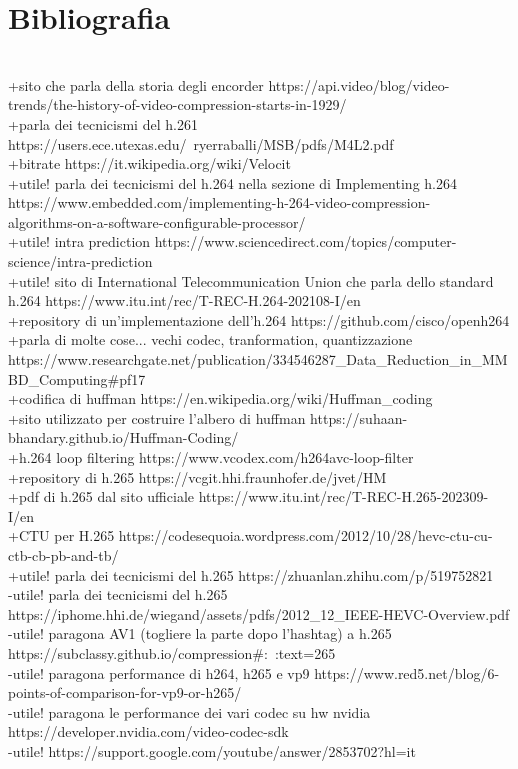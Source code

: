\documentclass[a4paper,12pt, oneside]{article}
\begin{document}
\section{Bibliografia}
\\+sito che parla della storia degli encorder https://api.video/blog/video-trends/the-history-of-video-compression-starts-in-1929/
\\+parla dei tecnicismi del h.261 https://users.ece.utexas.edu/~ryerraballi/MSB/pdfs/M4L2.pdf
\\+bitrate https://it.wikipedia.org/wiki/Velocit%
\\+utile! parla dei tecnicismi del h.264 nella sezione di Implementing h.264 https://www.embedded.com/implementing-h-264-video-compression-\\algorithms-on-a-software-configurable-processor/
\\+utile! intra prediction https://www.sciencedirect.com/topics/computer-science/intra-prediction
\\+utile! sito di International Telecommunication Union che parla dello standard h.264 https://www.itu.int/rec/T-REC-H.264-202108-I/en
\\+repository di un'implementazione dell'h.264 https://github.com/cisco/openh264
\\+parla di molte cose... vechi codec, tranformation, quantizzazione https://www.researchgate.net/publication/334546287_Data_Reduction_in_MMBD_Computing#pf17
\\+codifica di huffman https://en.wikipedia.org/wiki/Huffman_coding
\\+sito utilizzato per costruire l'albero di huffman https://suhaan-bhandary.github.io/Huffman-Coding/
\\+h.264 loop filtering https://www.vcodex.com/h264avc-loop-filter
\\+repository di h.265 https://vcgit.hhi.fraunhofer.de/jvet/HM
\\+pdf di h.265 dal sito ufficiale https://www.itu.int/rec/T-REC-H.265-202309-I/en
\\+CTU per H.265 https://codesequoia.wordpress.com/2012/10/28/hevc-ctu-cu-ctb-cb-pb-and-tb/
\\+utile! parla dei tecnicismi del h.265 https://zhuanlan.zhihu.com/p/519752821
\\-utile! parla dei tecnicismi del h.265 https://iphome.hhi.de/wiegand/assets/pdfs/2012_12_IEEE-HEVC-Overview.pdf
\\-utile! paragona AV1 (togliere la parte dopo l'hashtag) a h.265 https://subclassy.github.io/compression#:~:text=265%
\\-utile! paragona performance di h264, h265 e vp9 https://www.red5.net/blog/6-points-of-comparison-for-vp9-or-h265/
\\-utile! paragona le performance dei vari codec su hw nvidia https://developer.nvidia.com/video-codec-sdk
\\-utile! https://support.google.com/youtube/answer/2853702?hl=it
\end{document}
